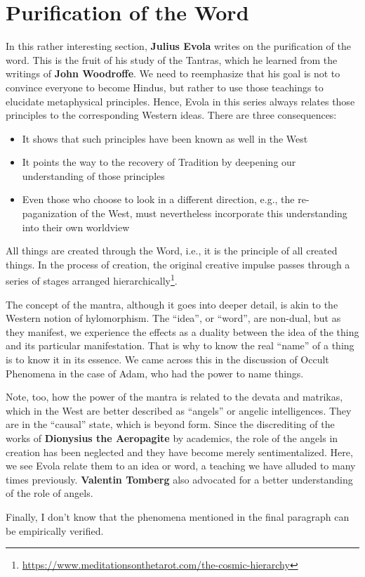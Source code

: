 \section{Purification of the Word}

\begin{quotex}
In this rather interesting section, \textbf{Julius Evola} writes on the purification of the word. This is the fruit of his study of the Tantras, which he learned from the writings of \textbf{John Woodroffe}. We need to reemphasize that his goal is not to convince everyone to become Hindus, but rather to use those teachings to elucidate metaphysical principles. Hence, Evola in this series always relates those principles to the corresponding Western ideas. There are three consequences:

\begin{itemize}
\item It shows that such principles have been known as well in the West 
\item It points the way to the recovery of Tradition by deepening our understanding of those principles 
\item Even those who choose to look in a different direction, e.g., the re-paganization of the West, must nevertheless incorporate this understanding into their own worldview 
\end{itemize}

All things are created through the Word, i.e., it is the principle of all created things. In the process of creation, the original creative impulse passes through a series of stages arranged hierarchically\footnote{\url{https://www.meditationsonthetarot.com/the-cosmic-hierarchy}}. 

The concept of the mantra, although it goes into deeper detail, is akin to the Western notion of hylomorphism. The “idea”, or “word”, are non-dual, but as they manifest, we experience the effects as a duality between the idea of the thing and its particular manifestation. That is why to know the real “name” of a thing is to know it in its essence. We came across this in the discussion of Occult Phenomena in the case of Adam, who had the power to name things. 

Note, too, how the power of the mantra is related to the devata and matrikas, which in the West are better described as “angels” or angelic intelligences. They are in the “causal” state, which is beyond form. Since the discrediting of the works of \textbf{Dionysius the Aeropagite} by academics, the role of the angels in creation has been neglected and they have become merely sentimentalized. Here, we see Evola relate them to an idea or word, a teaching we have alluded to many times previously. \textbf{Valentin Tomberg} also advocated for a better understanding of the role of angels.

Finally, I don't know that the phenomena mentioned in the final paragraph can be empirically verified. 

\end{quotex}


